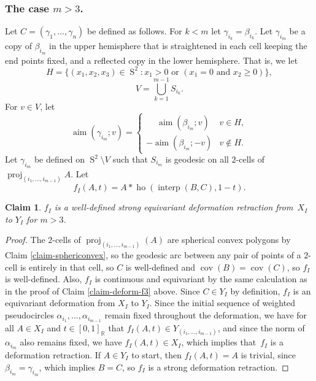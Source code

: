 \documentclass[JEP,XML,SOM,Unicode,NoFloatCountersInSection,published]{cedram}
\newtheorem{claim}[theorem]{Claim}
\theoremstyle{remark}
\let\mb\mathbb
\DeclareMathOperator{\sphere}{S}
\DeclareMathOperator{\aim}{aim}
\DeclareMathOperator{\proj}{proj}
\DeclareMathOperator{\interp}{interp}
\DeclareMathOperator{\ho}{ho}
\DeclareMathOperator{\cov}{cov}
\begin{document}
\subsubsection*{The case $m>3$.}
Let $C\!=\!(\gamma_1,\dots,\gamma_n)$ be defined as follows.
For $k\!<\!m$ let $\gamma_{i_k}\!=\!\beta_{i_k}$.
Let $\gamma_{i_m}$ be a copy of $\beta_{i_m}$ in the upper hemisphere that is straightened in each cell keeping the end points fixed, and a reflected copy in the lower hemisphere.
That is, we let
\[ H = \bigl\{(x_1,x_2,x_3) \in \sphere^2 :x_1 > 0 \text{ or } (x_1=0 \text{ and } x_2 \geq 0)\bigr\}, \]
\[ V = \bigcup_{k=1}^{m-1} S_{i_k}. \]
For $v \in V$, let
\[ \aim (\gamma_{i_m}; v) = \begin{cases}
\phantom{-}\aim (\beta_{i_m}; v) & v \in H, \\
{-}\aim (\beta_{i_m}; -v) & v \not\in H.
\end{cases}\]
Let $\gamma_{i_m}$ be defined on $\sphere^2 \setminus V$ such that $S_{i_m}$ is geodesic on all $2$-cells of $\proj_{(i_1,\dots,i_{m-1})} A$.
Let
\[ f_{I}(A,t) = A*\ho(\interp(B,C),1-t).\]

\begin{claim}\label{claim-deform-f}
$f_I$ is a well-defined strong equivariant deformation retraction from~$X_I$ to $Y_I$ for $m>3$.
\end{claim}

\begin{proof}
The $2$-cells of $\proj_{(i_1,\dots,i_{m-1})}(A)$ are spherical convex polygons by Claim \ref{claim-sphericonvex}, so the geodesic arc between any pair of points of a $2$-cell is entire\-ly in that cell, so $C$ is well-defined and $\cov(B)=\cov(C)$, so $f_I$ is well-defined.
Also, $f_I$ is continuous and equivariant by the same calculation as in the proof of Claim \ref{claim-deform-f3} above.
Since $C \in Y_I$ by definition, $f_I$ is an equivariant deformation from $X_I$ to $Y_I$.
Since the initial sequence of weighted pseudocircles $\alpha_{i_1},\dots,\alpha_{i_{m-1}}$ remain fixed throughout the deformation, we have for all $A \in X_I$ and $t \in [0,1]_\mb{R}$ that $f_I(A,t) \in Y_{(i_1,\dots,i_{m-1})}$, and since the norm of $\alpha_{i_m}$ also remains fixed, we have $f_I(A,t) \in X_I$, which implies that~$f_I$ is a deformation retraction.
If $A \in Y_I$ to start, then $f_I(A,t) = A$ is trivial, since $\beta_{i_m} = \gamma_{i_m}$, which implies $B=C$, so $f_I$ is a strong deformation retraction.
\end{proof}
\end{document}
